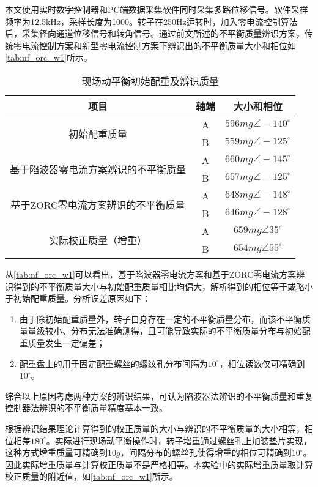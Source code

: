 \documentclass[
  lang=cn,
  degree=master,
  openany,oneside
]{nuaathesis}
\begin{document}
本文使用实时数字控制器和PC端数据采集软件同时采集多路位移信号。软件采样频率为12.5kHz，采样长度为1000。转子在250Hz运转时，加入零电流控制算法后，采集径向通道位移信号和转角信号。通过前文所述的不平衡质量辨识方案，传统零电流控制方案和新型零电流控制方案下辨识出的不平衡质量大小和相位如\autoref{tab:nf_orc_w1}所示。

\begin{table}[h!]
  \caption[现场动平衡初始配重及辨识质量]{现场动平衡初始配重及辨识质量\label{tab:nf_orc_w1}}
\begin{tabular}{ccc}
    \toprule
    	项目  & 轴端 & 大小和相位 \\
    \midrule
		\multirow{2}{*}{初始配重质量}   
		& A  & $596mg \angle -140^{\circ}$      \\
		& B  & $559mg \angle -125^{\circ}$      \\    
		\multirow{2}{*}{基于陷波器零电流方案辨识的不平衡质量}   
		& A  & $660mg \angle -145^{\circ}$      \\
		& B  & $657mg \angle -125^{\circ}$      \\
		\multirow{2}{*}{基于ZORC零电流方案辨识的不平衡质量} 
		& A  & $648mg \angle -148^{\circ}$      \\
        & B  & $646mg \angle -128^{\circ}$     	\\
		\multirow{2}{*}{实际校正质量（增重）} 
		& A  & $659mg \angle 35^{\circ}$      \\
        & B  & $654mg \angle 55^{\circ}$     	\\        
    \bottomrule
\end{tabular}
\end{table}

从\autoref{tab:nf_orc_w1}可以看出，基于陷波器零电流方案和基于ZORC零电流方案辨识得到的不平衡质量大小与初始配重质量相比均偏大，解析得到的相位等于或略小于初始配重质量。分析误差原因如下：
\begin{enumerate}
	\item 由于除初始配重质量外，转子自身存在一定的不平衡质量分布，而该不平衡质量量级较小、分布无法准确测得，且可能导致实际的不平衡质量分布与初始配重质量发生一定偏差；
	\item 配重盘上的用于固定配重螺丝的螺纹孔分布间隔为$10^{\circ}$，相位读数仅可精确到$10^{\circ}$。
\end{enumerate}

综合以上原因考虑两种方案的辨识结果，可认为陷波器法辨识的不平衡质量和重复控制器法辨识的不平衡质量精度基本一致。

根据辨识结果理论计算得到的校正质量的大小与辨识的不平衡质量的大小相等，相位相差$180^{\circ}$。实际进行现场动平衡操作时，转子增重通过螺丝孔上加装垫片实现，这种方式增重质量可精确到$10g$，间隔分布的螺丝孔使得增重的相位可精确到$10^{\circ}$。因此实际增重质量与计算校正质量不是严格相等。本实验中的实际增重质量取计算校正质量的附近值，如\autoref{tab:nf_orc_w1}所示。
\end{document}
